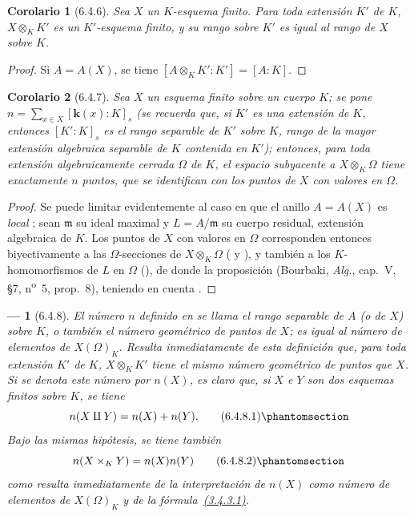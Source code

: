 \documentclass[oneside]{amsart}
\theoremstyle{ega-env-style}
\newtheorem*{env}{---}
\theoremstyle{ega-thm-env-style}
\newtheorem*{corollary}{Corolario}
\theoremstyle{ega-defn-env-style}
\newcommand{\oldpage}[2][]{{\marginnote{\normalfont{\textbf{#1}~|~#2}}}\ignorespaces}
\let\EGAOriginalLabel\label
\renewcommand{\label}[1]{\phantomsection\EGAOriginalLabel{#1}}
\begin{document}
\begin{corollary}[6.4.6]
\label{I.6.4.6}
Sea $X$ un $K$-esquema finito.
Para toda extensión $K'$ de $K$, $X\otimes_K K'$ es un $K'$-esquema finito, y su rango sobre $K'$ es igual al rango de $X$ sobre $K$.
\end{corollary}

\begin{proof}
Si $A=A(X)$, se tiene $[A\otimes_K K':K']=[A:K]$.
\end{proof}

\begin{corollary}[6.4.7]
\label{I.6.4.7}
Sea $X$ un esquema finito sobre un cuerpo $K$;
se pone $n=\sum_{x\in X}[\boldsymbol{k}(x):K]_s$ \textup{(se recuerda que, si $K'$ es una extensión de $K$, entonces $[K':K]_s$ es el \emph{rango separable} de $K'$ sobre $K$, rango de la mayor extensión algebraica separable de $K$ contenida en $K'$)};
\oldpage[I]{149}
entonces,
para toda extensión algebraicamente cerrada $\Omega$ de $K$, el espacio subyacente a $X\otimes_K\Omega$ tiene exactamente $n$ puntos, que se identifican con los puntos de $X$ con valores en $\Omega$.
\end{corollary}

\begin{proof}
Se puede limitar evidentemente al caso en que el anillo $A=A(X)$ es \emph{local} ;
sean $\mathfrak m$ su ideal maximal y $L=A/\mathfrak m$ su cuerpo residual, extensión algebraica de $K$.
Los puntos de $X$ con valores en $\Omega$ corresponden entonces biyectivamente a las $\Omega$-secciones de $X\otimes_K\Omega$ ( y ), y también a los $K$-homomorfismos de $L$ en $\Omega$ (), de donde la proposición (Bourbaki, \emph{Alg.}, cap.~V, §7, n\textsuperscript{o}~5, prop.~8), teniendo en cuenta .
\end{proof}

\begin{env}[6.4.8]
\label{I.6.4.8}
El número $n$ definido en  se llama el \emph{rango separable} de $A$ (o de $X$) sobre $K$, o también el \emph{número geométrico de puntos} de $X$;
es igual al número de elementos de $X(\Omega)_K$.
Resulta inmediatamente de esta definición que, para toda extensión $K'$ de $K$, $X\otimes_K K'$ tiene el mismo número geométrico de puntos que $X$.
Si se denota este número por $n(X)$, es claro que, si $X$ e $Y$ son dos esquemas finitos sobre $K$, se tiene
\[
  n(X\amalg Y)=n(X)+n(Y).
  \tag{6.4.8.1}\label{I.6.4.8.1-fr}
\]
Bajo las mismas hipótesis, se tiene también
\[
  n(X\times_K Y)=n(X)n(Y)
  \tag{6.4.8.2}\label{I.6.4.8.2-fr}
\]
como resulta inmediatamente de la interpretación de $n(X)$ como número de elementos de $X(\Omega)_K$ y de la fórmula~\hyperref[I.3.4.3.1]{(3.4.3.1)}.
\end{env}
\end{document}
